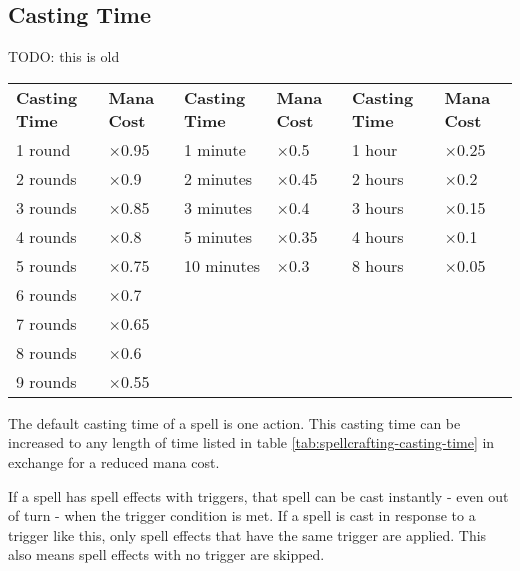 \subsection{Casting Time}
TODO: this is old
\begin{table*}[ht]
    \unclassedrowcolors
    \begin{tabularx}{\textwidth}{l X l X l X}
        \textbf{Casting Time} & \textbf{Mana Cost} & \textbf{Casting Time} & \textbf{Mana Cost} & \textbf{Casting Time} & \textbf{Mana Cost} \\
        1 round  & $\times$0.95 & 1 minute   & $\times$0.5  & 1 hour  & $\times$0.25 \\
        2 rounds & $\times$0.9  & 2 minutes  & $\times$0.45 & 2 hours & $\times$0.2  \\
        3 rounds & $\times$0.85 & 3 minutes  & $\times$0.4  & 3 hours & $\times$0.15 \\
        4 rounds & $\times$0.8  & 5 minutes  & $\times$0.35 & 4 hours & $\times$0.1  \\
        5 rounds & $\times$0.75 & 10 minutes & $\times$0.3  & 8 hours & $\times$0.05 \\
        6 rounds & $\times$0.7  & & & & \\
        7 rounds & $\times$0.65 & & & & \\
        8 rounds & $\times$0.6  & & & & \\
        9 rounds & $\times$0.55 & & & & \\
    \end{tabularx}
    \caption{Spellcrafting Casting Time}
    \label{tab:spellcrafting-casting-time}
\end{table*}
The default casting time of a spell is one action. This casting time
can be increased to any length of time listed in table
\ref{tab:spellcrafting-casting-time} in exchange for a reduced mana cost.

If a spell has spell effects with triggers, that spell can be cast
instantly - even out of turn - when the trigger condition is met. If a
spell is cast in response to a trigger like this, only spell effects
that have the same trigger are applied. This also means spell effects
with no trigger are skipped.

